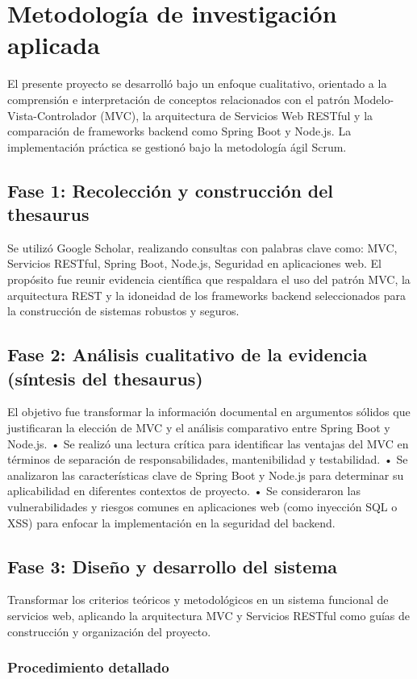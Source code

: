 \section{Metodología de investigación aplicada}
El presente proyecto se desarrolló bajo un enfoque cualitativo, orientado a la comprensión e interpretación de conceptos relacionados con el patrón Modelo-Vista-Controlador (MVC), la arquitectura de Servicios Web RESTful y la comparación de frameworks backend como Spring Boot y Node.js. La implementación práctica se gestionó bajo la metodología ágil Scrum.

\subsection{Fase 1: Recolección y construcción del thesaurus}
Se utilizó Google Scholar, realizando consultas con palabras clave como: MVC, Servicios RESTful, Spring Boot, Node.js, Seguridad en aplicaciones web. El propósito fue reunir evidencia científica que respaldara el uso del patrón MVC, la arquitectura REST y la idoneidad de los frameworks backend seleccionados para la construcción de sistemas robustos y seguros.

\subsection{Fase 2: Análisis cualitativo de la evidencia (síntesis del thesaurus)}
El objetivo fue transformar la información documental en argumentos sólidos que justificaran la elección de MVC y el análisis comparativo entre Spring Boot y Node.js.
•	Se realizó una lectura crítica para identificar las ventajas del MVC en términos de separación de responsabilidades, mantenibilidad y testabilidad.
•	Se analizaron las características clave de Spring Boot y Node.js para determinar su aplicabilidad en diferentes contextos de proyecto.
•	Se consideraron las vulnerabilidades y riesgos comunes en aplicaciones web (como inyección SQL o XSS) para enfocar la implementación en la seguridad del backend.

\subsection{Fase 3: Diseño y desarrollo del sistema}
Transformar los criterios teóricos y metodológicos en un sistema funcional de servicios web, aplicando la arquitectura MVC y Servicios RESTful como guías de construcción y organización del proyecto.

\subsubsection{Procedimiento detallado}
